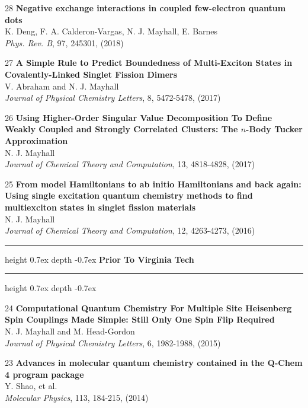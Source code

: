 \documentclass[10pt]{article}
\newenvironment{lonelist}[1][\enskip\textbullet]%
        {\vspace{-\baselineskip}\begin{list}{#1}{%
        \setlength{\partopsep}{0pt}%
        \setlength{\topsep}{0pt}}}
        {\end{list}\vspace{-.6\baselineskip}}
\def\Vhrulefill{\leavevmode\leaders\hrule height 0.7ex depth \dimexpr0.4pt-0.7ex\hfill\kern0pt}
\begin{document}
\begin{lonelist}
\item[28\hspace{4pt}] \textbf{Negative exchange interactions in coupled few-electron quantum dots} \\
	K. Deng, F. A. Calderon-Vargas, N. J. Mayhall, E. Barnes\\
\textsl{Phys. Rev. B}, 97, 245301, (2018)

\item[27\hspace{4pt}] \textbf{A Simple Rule to Predict Boundedness of Multi-Exciton States in Covalently-Linked Singlet Fission Dimers}\\
V. Abraham and N. J. Mayhall\\
\textsl{Journal of Physical Chemistry Letters}, 8, 5472-5478, (2017)

\item[26\hspace{4pt}] \textbf{Using Higher-Order Singular Value Decomposition To Define Weakly Coupled and Strongly Correlated Clusters: The $n$-Body Tucker Approximation}\\
N. J. Mayhall\\
\textsl{Journal of Chemical Theory and Computation}, 13, 4818-4828, (2017)

\item[25\hspace{4pt}] \textbf{From model Hamiltonians to ab initio Hamiltonians and back again: Using single excitation quantum chemistry methods to find multiexciton states in singlet fission materials}\\
N. J. Mayhall\\
\textsl{Journal of Chemical Theory and Computation}, 12, 4263-4273, (2016)

\begin{center}
	\vspace{5pt}
	\Vhrulefill{} \textbf{Prior To Virginia Tech} {} \Vhrulefill
	\vspace{4pt}
\end{center}


\item[24\hspace{4pt}] \textbf{Computational Quantum Chemistry For Multiple Site Heisenberg Spin Couplings Made Simple: Still Only One Spin Flip Required}\\
N. J. Mayhall and M. Head-Gordon\\
\textsl{Journal of Physical Chemistry Letters}, 6, 1982-1988, (2015)


\item[23\hspace{4pt}] \textbf{Advances in molecular quantum chemistry contained in the Q-Chem 4 program package}\\
Y. Shao, et al.\\
\textsl{Molecular Physics}, 113, 184-215, (2014)


\end{lonelist}
\end{document}
